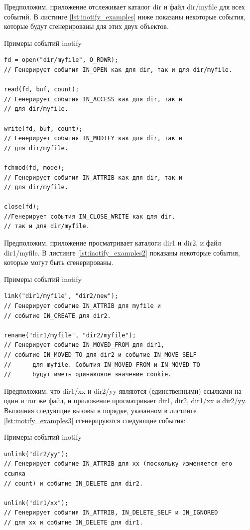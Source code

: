 \documentclass[14pt, russian]{scrartcl}
\begin{document}
Предположим, приложение отслеживает каталог dir и файл dir/myfile для всех
событий. В листинге \ref{lst:inotify_examples} ниже показаны некоторые события, которые будут сгенерированы
для этих двух объектов.

\begin{listing}[H]
\caption{Примеры событий inotify}
\label{lst:inotify_examples}
\begin{verbatim}
fd = open("dir/myfile", O_RDWR);
// Генерирует события IN_OPEN как для dir, так и для dir/myfile.

read(fd, buf, count);
// Генерирует события IN_ACCESS как для dir, так и
// для dir/myfile.

write(fd, buf, count);
// Генерирует события IN_MODIFY как для dir, так и
// для dir/myfile.

fchmod(fd, mode);
// Генерирует события IN_ATTRIB как для dir, так и
// для dir/myfile.

close(fd);
//Генерирует события IN_CLOSE_WRITE как для dir,
// так и для dir/myfile.
\end{verbatim}
\end{listing}


Предположим, приложение просматривает каталоги dir1 и dir2,
и файл dir1/myfile. В листинге \ref{lst:inotify_examples2} показаны некоторые
события, которые могут быть сгенерированы.

\begin{listing}[H]
\caption{Примеры событий inotify}
\label{lst:inotify_examples2}
\begin{verbatim}
link("dir1/myfile", "dir2/new");
// Генерирует событие IN_ATTRIB для myfile и
// событие IN_CREATE для dir2.

rename("dir1/myfile", "dir2/myfile");
// Генерирует событие IN_MOVED_FROM для dir1,
// событие IN_MOVED_TO для dir2 и событие IN_MOVE_SELF
//      для myfile. События IN_MOVED_FROM и IN_MOVED_TO
//      будут иметь одинаковое значение cookie.
\end{verbatim}
\end{listing}

Предположим, что dir1/xx и dir2/yy являются (единственными) ссылками на один и
тот же файл, и приложение просматривает dir1, dir2, dir1/xx и dir2/yy. Выполняя
следующие вызовы в порядке, указанном в листинге \ref{lst:inotify_examples3}
сгенерируются следующие события:

\begin{listing}[H]
\caption{Примеры событий inotify}
\label{lst:inotify_examples3}
\begin{verbatim}
unlink("dir2/yy");
// Генерирует событие IN_ATTRIB для xx (поскольку изменяется его ссылка
// count) и событие IN_DELETE для dir2.

unlink("dir1/xx");
// Генерирует события IN_ATTRIB, IN_DELETE_SELF и IN_IGNORED
// для xx и событие IN_DELETE для dir1.
\end{verbatim}
\end{listing}
\end{document}

